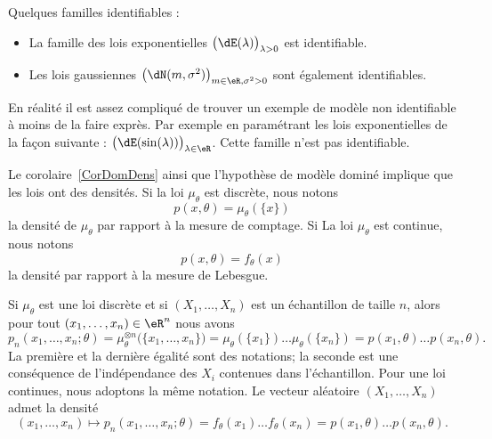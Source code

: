 \begin{example}
    Quelques familles identifiables :
    \begin{itemize}
        \item 
    La famille des lois exponentielles \( \big( \dE(\lambda) \big)_{\lambda>0}\) est identifiable. 
\item
    Les lois gaussiennes \( \big( \dN(m,\sigma^2) \big)_{m\in\eR,\sigma^2>0}\) sont également identifiables.
    \end{itemize}
    En réalité il est assez compliqué de trouver un exemple de modèle non identifiable à moins de la faire exprès. Par exemple en paramétrant les lois exponentielles de la façon suivante : \( \big( \dE(\sin(\lambda)) \big)_{\lambda\in\eR}\). Cette famille n'est pas identifiable.
\end{example}

Le corolaire~\ref{CorDomDens} ainsi que l'hypothèse de modèle dominé implique que les lois ont des densités. Si la loi \( \mu_{\theta}\) est discrète, nous notons
\begin{equation}
    p(x,\theta)=\mu_{\theta}(\{ x \})
\end{equation}
la densité de \( \mu_{\theta}\) par rapport à la mesure de comptage. Si La loi \( \mu_{\theta}\) est continue, nous notons
\begin{equation}
    p(x,\theta)=f_{\theta}(x)
\end{equation}
la densité par rapport à la mesure de Lebesgue.

Si \( \mu_{\theta}\) est une loi discrète et si \( (X_1,\ldots,X_n)\) est un échantillon de taille \( n\), alors pour tout \( (x_1,\ldots,x_n)\in\eR^n\) nous avons
\begin{equation}
    p_n(x_1,\ldots,x_n;\theta)=\mu_{\theta}^{\otimes n}\big( \{ x_1,\ldots,x_n \} \big)=\mu_{\theta}(\{ x_1 \})\ldots\mu_{\theta}(\{ x_n \})=p(x_1,\theta)\ldots p(x_n,\theta).
\end{equation}
La première et la dernière égalité sont des notations; la seconde est une conséquence de l'indépendance des \( X_i\) contenues dans l'échantillon. Pour une loi continues, nous adoptons la même notation. Le vecteur aléatoire \( (X_1,\ldots,X_n)\) admet la densité
\begin{equation}
    (x_1,\ldots,x_n)\mapsto p_n(x_1,\ldots,x_n;\theta)=f_{\theta}(x_1)\ldots f_{\theta}(x_n)=p(x_1,\theta)\ldots p(x_n,\theta).
\end{equation}

